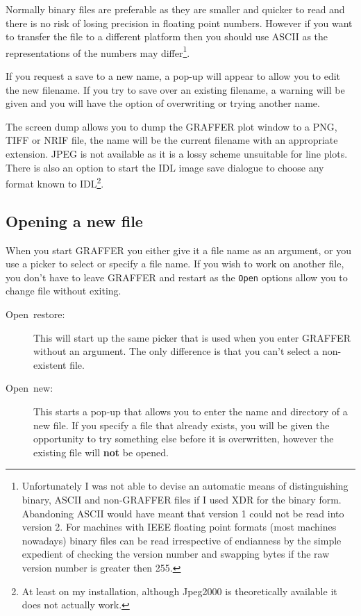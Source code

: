 \documentclass[11pt,twoside,english]{article}
\begin{document}
Normally binary files are preferable as they are smaller and quicker to
read and there is no risk of losing precision in floating point
numbers. However if you want to transfer the file to a different
platform then you should use ASCII as the representations of the
numbers may differ\footnote{Unfortunately I was not able to devise an
  automatic means of distinguishing binary, ASCII and non-GRAFFER files
  if I used XDR for the binary form.  Abandoning ASCII would have meant
  that version 1 could not be read into version 2. For machines with
  IEEE floating point formats (most machines nowadays) binary files can
  be read irrespective of endianness by the simple expedient of
  checking the version number and swapping bytes if the raw version
  number is greater then 255.}.

If you request a save to a new name, a pop-up will appear to allow you
to edit the new filename. If you try to save over an existing filename,
a warning will be given and you will have the option of overwriting or
trying another name.

The screen dump allows you to dump the GRAFFER plot window to a PNG,
TIFF or NRIF file, the name will be the current filename with an
appropriate extension. JPEG is not available as it is a lossy scheme
unsuitable for line plots. There is also an option to start the IDL
image save dialogue to choose any format known to IDL\footnote{At least
  on my installation, although Jpeg2000 is theoretically available it
  does not actually work.}.


\subsection{Opening a new file}

When you start GRAFFER you either give it a file name as an argument,
or you use a picker to select or specify a file name. If you wish to
work on another file, you don't have to leave GRAFFER and restart as
the \texttt{Open} options allow you to change file without exiting.

\begin{description}
\item [Open~restore:]This will start up the same picker that is used
  when you enter GRAFFER without an argument. The only difference is
  that you can't select a non-existent file.
\item [Open~new:]This starts a pop-up that allows you to enter the name
  and directory of a new file. If you specify a file that already
  exists, you will be given the opportunity to try something else
  before it is overwritten, however the existing file will \textbf{not}
  be opened.
\end{description}
\end{document}
